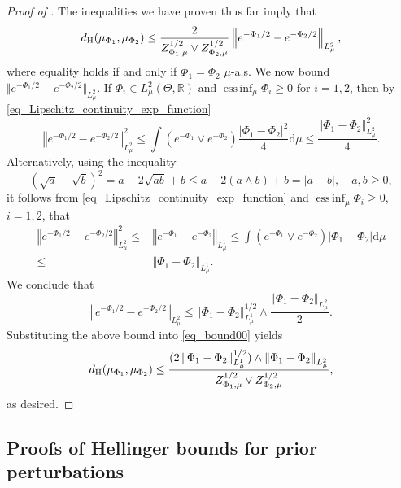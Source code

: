\documentclass[a4paper]{scrartcl}
\theoremstyle{definition}
\numberwithin{equation}{section}
\newcommand{\R}{\mathbb{R}}
\newcommand{\rd}{\mathrm{d}}
\DeclareMathOperator*{\essinf}{ess\,inf}
\newcommand{\abs}[1]{\vert #1\vert}
\newcommand{\Abs}[1]{\left\vert#1\right\vert}
\newcommand{\norm}[1]{\Vert #1 \Vert}
\newcommand{\Norm}[1]{\left\Vert #1 \right\Vert}
\newcommand{\Hel}[0]{\textup{H}}
\begin{document}
\begin{proof}[Proof of ]
  The inequalities we have proven thus far imply that
  \begin{equation}
    \label{eq_bound00}
    d_{\Hel}(\mu_{\Phi_1},\mu_{\Phi_2})\leq \frac{2}{Z_{\Phi_1,\mu}^{1/2}\vee Z_{\Phi_2,\mu}^{1/2}}\Norm{e^{-\Phi_1/2}-e^{-\Phi_2/2}}_{L^2_\mu},
  \end{equation}
  where equality holds if and only if $\Phi_1=\Phi_2$ $\mu$-a.s.
  We now bound $\norm{e^{-\Phi_1/2}-e^{-\Phi_2/2}}_{L^2_\mu}$.
  If $\Phi_i\in L^2_\mu(\Theta,\R)$ and $\essinf_\mu \Phi_i\geq 0$ for $i=1,2$, then by \eqref{eq_Lipschitz_continuity_exp_function}
 \begin{equation*}
   \Norm{e^{-\Phi_1/2}-e^{-\Phi_2/2}}_{L^2_\mu}^2\leq \int(e^{-\Phi_1}\vee e^{-\Phi_2})\frac{\abs{\Phi_1-\Phi_2}^2}{4}\rd \mu \leq \frac{\Norm{\Phi_1-\Phi_2}_{L^2_\mu}^{2}}{4}.
 \end{equation*}
 Alternatively, using the inequality
 \begin{equation*}
 (\sqrt{a}-\sqrt{b})^2=a-2\sqrt{ab}+b\leq a-2(a\wedge b) +b=\abs{a-b},\quad a,b\geq 0,
\end{equation*}
it follows from \eqref{eq_Lipschitz_continuity_exp_function} and $\essinf_\mu\Phi_i\geq 0$, $i=1,2$, that 
 \begin{align*}
   \Norm{e^{-\Phi_1/2}-e^{-\Phi_2/2}}_{L^2_\mu}^2\leq&\Norm{e^{-\Phi_1}-e^{-\Phi_2}}_{L^1_\mu} \leq  \int (e^{-\Phi_1}\vee e^{-\Phi_2})\Abs{\Phi_1-\Phi_2}\rd \mu 
   \\
   \leq & \Norm{\Phi_1-\Phi_2}_{L^1_\mu}.
 \end{align*}
We conclude that 
\begin{equation*}
 \Norm{e^{-\Phi_1/2}-e^{-\Phi_2/2}}_{L^2_\mu}\leq \Norm{\Phi_1-\Phi_2}_{L^1_\mu}^{1/2}\wedge \frac{\Norm{\Phi_1-\Phi_2}_{L^2_\mu}}{2}.
\end{equation*}
Substituting the above bound into \eqref{eq_bound00} yields
\begin{equation*}
  d_{\Hel}(\mu_{\Phi_1},\mu_{\Phi_2})\leq \frac{(2\Norm{\Phi_1-\Phi_2}_{L^1_\mu}^{1/2})\wedge \Norm{\Phi_1-\Phi_2}_{L^2_\mu}}{Z_{\Phi_1,\mu}^{1/2}\vee Z_{\Phi_2,\mu}^{1/2}},
\end{equation*}
as desired.
\end{proof}


\subsection{Proofs of Hellinger bounds for prior perturbations}
\label{section_Hellingerbounds_Priorperturbations_proofs}
\end{document}
